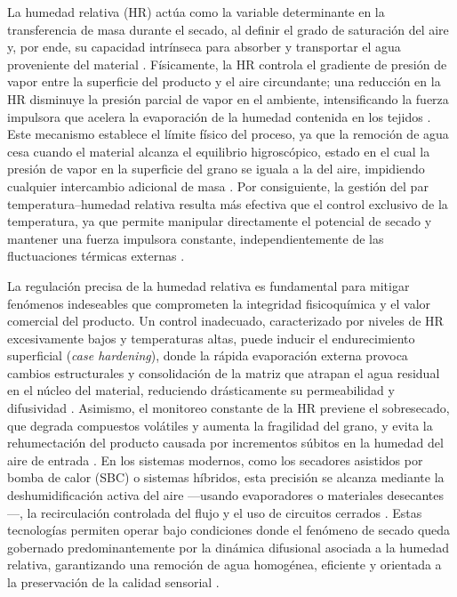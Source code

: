 La humedad relativa (HR) actúa como la variable determinante en la transferencia de masa durante el secado, al definir el grado de saturación del aire y, por ende, su capacidad intrínseca para absorber y transportar el agua proveniente del material \parencite{abidin_improving_2024, gomez-daza_innovacion_2023}. Físicamente, la HR controla el gradiente de presión de vapor entre la superficie del producto y el aire circundante; una reducción en la HR disminuye la presión parcial de vapor en el ambiente, intensificando la fuerza impulsora que acelera la evaporación de la humedad contenida en los tejidos \parencite{cruz-ospina_improving_2026, phitakwinai_thinlayer_2019}. Este mecanismo establece el límite físico del proceso, ya que la remoción de agua cesa cuando el material alcanza el equilibrio higroscópico, estado en el cual la presión de vapor en la superficie del grano se iguala a la del aire, impidiendo cualquier intercambio adicional de masa \parencite{phitakwinai_thinlayer_2019, cruz-ospina_improving_2026}. Por consiguiente, la gestión del par temperatura--humedad relativa resulta más efectiva que el control exclusivo de la temperatura, ya que permite manipular directamente el potencial de secado y mantener una fuerza impulsora constante, independientemente de las fluctuaciones térmicas externas \parencite{gomez-daza_innovacion_2023}.

La regulación precisa de la humedad relativa es fundamental para mitigar fenómenos indeseables que comprometen la integridad fisicoquímica y el valor comercial del producto. Un control inadecuado, caracterizado por niveles de HR excesivamente bajos y temperaturas altas, puede inducir el endurecimiento superficial (\textit{case hardening}), donde la rápida evaporación externa provoca cambios estructurales y consolidación de la matriz que atrapan el agua residual en el núcleo del material, reduciendo drásticamente su permeabilidad y difusividad \parencite{liu_optimization_2025, tejeda-miramontes_phase-segmented_2025}. Asimismo, el monitoreo constante de la HR previene el sobresecado, que degrada compuestos volátiles y aumenta la fragilidad del grano, y evita la rehumectación del producto causada por incrementos súbitos en la humedad del aire de entrada \parencite{abdissa_harmonizing_2023, hadibi_effect_2025, p_romero_leiton_mathematical_2025}. En los sistemas modernos, como los secadores asistidos por bomba de calor (SBC) o sistemas híbridos, esta precisión se alcanza mediante la deshumidificación activa del aire —usando evaporadores o materiales desecantes—, la recirculación controlada del flujo y el uso de circuitos cerrados \parencite{chojnacka_improvements_2021, gomez-daza_innovacion_2023, rahnama_development_2025}. Estas tecnologías permiten operar bajo condiciones donde el fenómeno de secado queda gobernado predominantemente por la dinámica difusional asociada a la humedad relativa, garantizando una remoción de agua homogénea, eficiente y orientada a la preservación de la calidad sensorial \parencite{abdissa_harmonizing_2023, gomez-daza_innovacion_2023}.

